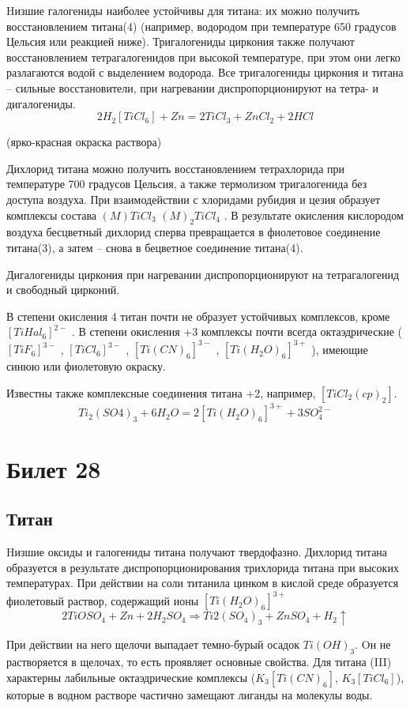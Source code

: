 \documentclass[11pt]{article}
\begin{document}
Hизшие галогениды наиболее устойчивы для титана: их можно получить восстановлением
титана(4) (например, водородом при температуре 650 градусов Цельсия или реакцией
ниже). Тригалогениды циркония также получают восстановлением тетрагалогенидов при
высокой температуре, при этом они легко разлагаются водой с выделением водорода.
Все тригалогениды циркония и титана – сильные восстановители, при нагревании
диспропорционируют на тетра- и дигалогениды.
$$2H _2 [TiCl _6 ] + Zn = 2TiCl _3 + ZnCl _2 + 2HCl$$
\begin{center}(ярко-красная окраска раствора)\end{center}

Дихлорид титана можно получить восстановлением тетрахлорида при температуре 700
градусов Цельсия, а также термолизом тригалогенида без доступа воздуха. При
взаимодействии с хлоридами рубидия и цезия образует комплексы состава $(M)TiCl _3$
$(M) _2 TiCl _4$ . В результате окисления кислородом воздуха бесцветный дихлорид сперва
превращается в фиолетовое соединение титана(3), а затем – снова в бецветное
соединение титана(4). 

Дигалогениды циркония при нагревании диспропорционируют на
тетрагалогенид и свободный цирконий.

В степени окисления 4 титан почти не образует устойчивых комплексов, кроме $[TiHal _6 ] ^{2-}$ . В
степени окисления +3 комплексы почти всегда октаэдрические ($[TiF _6 ] ^{3-}$ , $[TiCl _6 ] ^{3-}$ , $[Ti(CN) _6 ] ^{3-}$ , $[Ti(H_2O) _6 ] ^{3+}$ ), имеющие синюю или фиолетовую окраску. 

Известны также комплексные
соединения титана +2, например, $[TiCl _2 (cp) _2 ]$.
$$Ti _2 (SO4) _3 + 6H _2 O = 2[Ti(H _2 O) _6 ] ^{3+} + 3SO _4 ^{2-}$$


\section{Билет 28}
\subsection{Титан}
Hизшие оксиды и галогениды титана получают твердофазно. Дихлорид титана образуется
в результате диспропорционирования трихлорида титана при высоких температурах. При
действии на соли титанила цинком в кислой среде образуется фиолетовый раствор,
содержащий ионы $[Ti(H_2O)_6] ^{3+}$
$$2TiOSO_4 + Zn + 2H_2SO_4 \Rightarrow Ti2(SO_4)_3 + ZnSO_4 + H_2\uparrow$$

При действии на него щелочи выпадает темно-бурый осадок $Ti(OH)_3$. Oн не растворяется
в щелочах, то есть проявляет основные свойства. Для титана (III) характерны лабильные
октаэдрические комплексы ($K_3[Ti(CN)_6]$, $K_3[TiCl_6]$), которые в водном растворе частично
замещают лиганды на молекулы воды. 
\end{document}
